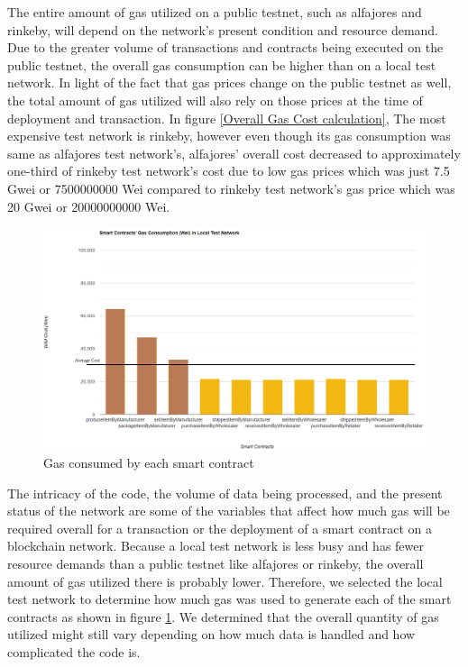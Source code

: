 The entire amount of gas utilized on a public testnet, such as alfajores and rinkeby, will depend on the network's present condition and resource demand. Due to the greater volume of transactions and contracts being executed on the public testnet, the overall gas consumption can be higher than on a local test network. In light of the fact that gas prices change on the public testnet as well, the total amount of gas utilized will also rely on those prices at the time of deployment and transaction. In figure \ref{Overall Gas Cost calculation}, The most expensive test network is rinkeby, however even though its gas consumption was same as alfajores test network's, alfajores' overall cost decreased to approximately one-third of rinkeby test network's cost due to low gas prices which was just 7.5 Gwei or 7500000000 Wei compared to rinkeby test network's gas price which was 20 Gwei or 20000000000 Wei.

\begin{figure}[h]
\centering
  \includegraphics[width=12cm]{includes/figures/smartcontractgas.png} 
  \caption{Gas consumed by each smart contract}
  \label{Gas consumed by each contract}
\end{figure}

\vspace{.5cm}
The intricacy of the code, the volume of data being processed, and the present status of the network are some of the variables that affect how much gas will be required overall for a transaction or the deployment of a smart contract on a blockchain network. Because a local test network is less busy and has fewer resource demands than a public testnet like alfajores or rinkeby, the overall amount of gas utilized there is probably lower. Therefore, we selected the local test network to determine how much gas was used to generate each of the smart contracts as shown in figure \ref{Gas consumed by each contract}. We determined that the overall quantity of gas utilized might still vary depending on how much data is handled and how complicated the code is.


